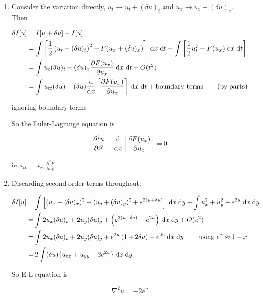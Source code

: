 \documentclass[a4paper]{article}
\begin{document}
\begin{enumerate}
	\item Consider the variation directly, $ u_{t} \to u_{t} + (\delta u)_{t} $ and $ u_{x} \to u_{x} + (\delta u)_{x} $. Then
	
	\begin{align*}
	\delta I[u] & = I[u + \delta u] - I[u] \\
	& = \int \left[ \frac{1}{2}\left(  u_{t} + (\delta u)_{t} \right)^{2} - F(u_{x} + (\delta u)_{x}) \right]  \; \mathrm{d} x \; \mathrm{d} t - \int \left[  \frac{1}{2} u_{t}^{2} - F(u_{x}) \; \mathrm{d} x \; \mathrm{d} t    \right]\\
	& = \int u_{t} (\delta u)_{t} - (\delta u)_{x} \frac{\partial F(u_{x}) }{\partial u_{x}} \; \mathrm{d} x \; \mathrm{d} t +   O(t^{2}) \\
	& = \int u_{tt} (\delta u) - (\delta u) \frac{\mathrm{d} }{\mathrm{d} x} \left[ \frac{\partial F(u_{x})  }{\partial u_{x}} \right]  \; \mathrm{d} x \; \mathrm{d} t + \text{boundary terms} \qquad \text{(by parts)}
	\end{align*}
	
	ignoring boundary terms
	
	So the Euler-Lagrange equation is 
	
	\[ \frac{\partial^{2} u}{\partial t^{2}} - \frac{\mathrm{d} }{\mathrm{d} x} \left[  \frac{\partial F(u_{x}) }{\partial u_{x}} \right]   = 0  \]
	
	ie $ u_{tt} = u_{xx} \frac{\partial^{2} F }{\partial u_{x}^{2}} $
	
	\item 
	
	Discarding second order terms throughout:
	
	\begin{align*}
	\delta I[u] & = \int \left[ (u_{x} + (\delta u)_{x})^{2} + (  u_{y} + (\delta u)_{y} )^{2} + e^{2(u + \delta u)}  \right] \; \mathrm{d} x \; \mathrm{d} y - \int u_{x}^{2} + u_{y}^{2} + e^{2u} \; \mathrm{d} x \; \mathrm{d} y   \\
	& = \int 2 u_{x} (\delta u)_{x} + 2 u_{y} ( \delta u)_{y} + \left(  e^{2(u + \delta u)} - e^{2u} \right) \; \mathrm{d} x \; \mathrm{d} y + O(u^{2}) \\
	& = \int 2 u_{x} (\delta u)_{x} + 2 u_{y} ( \delta u)_{y} + e^{2u}\left( 1 + 2 \delta u \right) - e^{2u}  \; \mathrm{d} x \; \mathrm{d} y  \qquad \text{ using } e^{x} \approx 1 + x\\
	& = 2 \int (\delta u) \{ u_{xx} + u_{yy}  + 2 e^{2u} \} \; \mathrm{d} x \; \mathrm{d} y
	\end{align*}
	
	So E-L equation is 
	
	\[ \nabla^{2} u  = -2e^{u}  \]
	
	
	
	
	
\end{enumerate}
\end{document}
